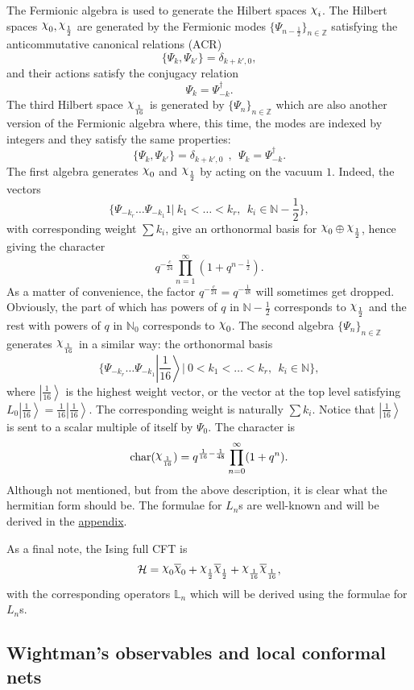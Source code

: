 \documentclass[twoside,11pt,titlepage]{amsart}
\newcommand{\ket}[1]{\left| #1 \right>} %
\renewcommand{\=}[1]{\stackrel{#1}{=}} %
\theoremstyle{definition}
\theoremstyle{remark}
\DeclareRobustCommand{\rchi}{{\mathpalette\irchi\relax}}
\newcommand{\irchi}[2]{\raisebox{\depth}{$#1\chi$}}
\begin{document}
The Fermionic algebra is used to generate the Hilbert spaces $\rchi_i$. The Hilbert spaces $\rchi_0,\rchi_\frac{1}{2}$ are generated by the Fermionic modes $\{\Psi_{n-\frac{1}{2}}\}_{n \in \mathbb{Z}}$ satisfying the anticommutative canonical relations (ACR)
$$\{\Psi_k,\Psi_{k'}\}=\delta_{k+k',0},$$
and their actions satisfy the conjugacy relation
$$\Psi_k=\Psi_{-k}^\dagger.$$
The third Hilbert space $\rchi_\frac{1}{16}$ is generated by $\{\Psi_{n}\}_{n\in \mathbb{Z}}$ which are also another version of the Fermionic algebra where, this time, the modes are indexed by integers and they satisfy the same properties:
$$\{\Psi_k,\Psi_{k'}\}=\delta_{k+k',0} \ \ , \ \ \Psi_k=\Psi_{-k}^\dagger.$$
The first algebra generates $\rchi_0$ and $\rchi_\frac{1}{2}$ by acting on the vacuum $1$. Indeed, the vectors 
$$\{\Psi_{-k_r}\ldots\Psi_{-k_1}1|\ k_1<\ldots<k_r, \ \ k_i \in \mathbb{N}-\frac{1}{2}\},$$
with corresponding weight $\sum k_i$, give an orthonormal basis for $\rchi_0 \oplus \rchi_\frac{1}{2}$, hence giving the character
$$q^{-\frac{c}{24}}\prod_{n=1}^\infty (1+q^{n-\frac{1}{2}}).$$
As a matter of convenience, the factor $q^{-\frac{c}{24}}=q^{-\frac{1}{48}}$ will sometimes get dropped. Obviously, the part of which has powers of $q$ in $\mathbb{N}-\frac{1}{2}$ corresponds to $\rchi_\frac{1}{2}$ and the rest with powers of $q$ in $\mathbb{N}_0$ corresponds to $\rchi_0$. 
The second algebra $\{\Psi_{n}\}_{n\in \mathbb{Z}}$ generates $\rchi_\frac{1}{16}$ in a similar way: the orthonormal basis
$$\{\Psi_{-k_r}\ldots\Psi_{-k_1}\ket{\frac{1}{16}}|\ 0<k_1<\ldots<k_r, \ \ k_i \in \mathbb{N}\},$$
where $\ket{\frac{1}{16}}$ is the highest weight vector, or the vector at the top level satisfying $L_0\ket{\frac{1}{16}}=\frac{1}{16}\ket{\frac{1}{16}}$. The corresponding weight is naturally $\sum k_i$. Notice that  $\ket{\frac{1}{16}}$ is sent to a scalar multiple of itself by $\Psi_0$. The character is
$$\text{char}(\rchi_\frac{1}{16})=q^{\frac{1}{16}-\frac{1}{48}}\prod_{n=0}^\infty(1+q^n).$$
Although not mentioned, but from the above description, it is clear what the hermitian form should be. The formulae for $L_n$s are well-known \cite{ginsparg1988applied} and will be derived in the \hyperref[A.1]{appendix}.

As a final note, the Ising full CFT is
$$\mathcal{H}=\rchi_0\overline{\rchi}_0 +\rchi_\frac{1}{2}\overline{\rchi}_\frac{1}{2} +\rchi_\frac{1}{16}\overline{\rchi}_\frac{1}{16},$$
with the corresponding operators $\mathbb{L}_n$ which will be derived using the formulae for $L_n$s.

\subsection{Wightman's observables and local conformal nets}\label{1.3}
\end{document}
